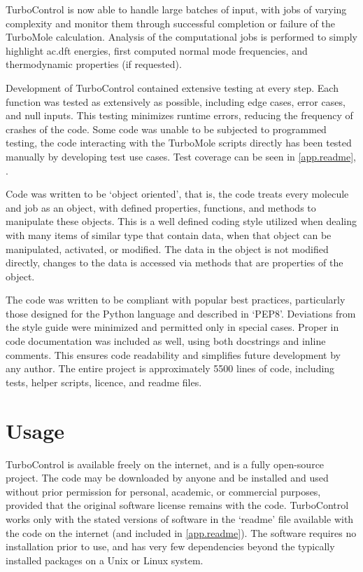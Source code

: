 TurboControl is now able to handle large batches of input, with jobs of varying complexity and monitor them through successful completion or failure of the TurboMole calculation. Analysis of the computational jobs is performed to simply highlight \gls{ac.dft} energies, first computed normal mode frequencies, and thermodynamic properties (if requested).  

Development of TurboControl contained extensive testing at every step. Each function was tested as extensively as possible, including edge cases, error cases, and null inputs. This testing minimizes runtime errors, reducing the frequency of crashes of the code. Some code was unable to be subjected to programmed testing, the code interacting with the TurboMole scripts directly has been tested manually by developing test use cases. Test coverage can be seen in \autoref{app.readme}, .

Code was written to be `object oriented', that is, the code treats every molecule and job as an object, with defined properties, functions, and methods to manipulate these objects. This is a well defined coding style utilized when dealing with many items of similar type that contain data, when that object can be manipulated, activated, or modified. The data in the object is not modified directly, changes to the data is accessed via methods that are properties of the object.

The code was written to be compliant with popular best practices, particularly those designed for the Python language and described in `PEP8'\autocite{pep8}. Deviations from the style guide were minimized and permitted only in special cases. Proper in code documentation was included as well, using both docstrings and inline comments\autocite{pep257}. This ensures code readability and simplifies future development by any author. The entire project is approximately 5500 lines of code, including tests, helper scripts, licence, and readme files. 

\section{Usage}

TurboControl is available freely on the internet, and is a fully open-source project\autocite{bulsink2014}. The code may be downloaded by anyone and be installed and used without prior permission for personal, academic, or commercial purposes, provided that the original software license remains with the code. TurboControl works only with the stated versions of software in the `readme' file available with the code on the internet (and included in \autoref{app.readme}). The software requires no installation prior to use, and has very few dependencies beyond the typically installed packages on a Unix or Linux system. 

